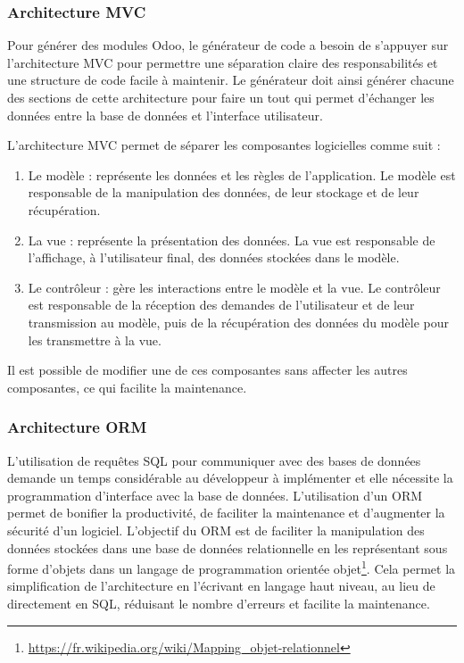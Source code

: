 \subsubsection{Architecture MVC}

Pour générer des modules Odoo, le générateur de code a besoin de s'appuyer sur l'architecture MVC pour permettre une séparation claire des responsabilités et une structure de code facile à maintenir. Le générateur doit ainsi générer chacune des sections de cette architecture pour faire un tout qui permet d'échanger les données entre la base de données et l'interface utilisateur.

L’architecture MVC permet de séparer les composantes logicielles comme suit : 
\begin{enumerate}
    \item Le modèle : représente les données et les règles de l’application. Le modèle est responsable de la manipulation des données, de leur stockage et de leur récupération.
    \item La vue : représente la présentation des données. La vue est responsable de l’affichage, à l’utilisateur final, des données stockées dans le modèle.
    \item Le contrôleur : gère les interactions entre le modèle et la vue. Le contrôleur est responsable de la réception des demandes de l’utilisateur et de leur transmission au modèle, puis de la récupération des données du modèle pour les transmettre à la vue.
\end{enumerate}
Il est possible de modifier une de ces composantes sans affecter les autres composantes, ce qui facilite la maintenance.

\subsubsection{Architecture ORM}

L'utilisation de requêtes SQL pour communiquer avec des bases de données demande un temps considérable au développeur à implémenter et elle nécessite la programmation d'interface avec la base de données. L'utilisation d'un ORM permet de bonifier la productivité, de faciliter la maintenance et d'augmenter la sécurité d'un logiciel. L’objectif du ORM est de faciliter la manipulation des données stockées dans une base de données relationnelle en les représentant sous forme d’objets dans un langage de programmation orientée objet\footnote{\url{https://fr.wikipedia.org/wiki/Mapping_objet-relationnel}}. Cela permet la simplification de l’architecture en l’écrivant en langage haut niveau, au lieu de directement en SQL, réduisant le nombre d'erreurs et facilite la maintenance.

